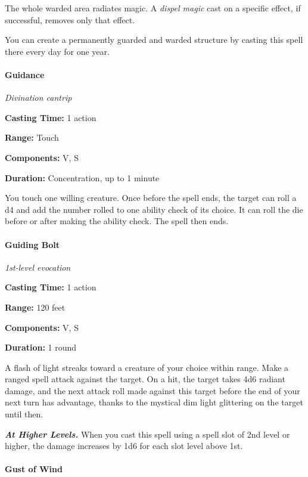 \documentclass[
]{article}
\begin{document}
The whole warded area radiates magic. A \emph{dispel magic} cast on a
specific effect, if successful, removes only that effect.

You can create a permanently guarded and warded structure by casting
this spell there every day for one year.

\hypertarget{guidance}{%
\paragraph{Guidance}\label{guidance}}

\emph{Divination cantrip}

\textbf{Casting Time:} 1 action

\textbf{Range:} Touch

\textbf{Components:} V, S

\textbf{Duration:} Concentration, up to 1 minute

You touch one willing creature. Once before the spell ends, the target
can roll a d4 and add the number rolled to one ability check of its
choice. It can roll the die before or after making the ability check.
The spell then ends.

\hypertarget{guiding-bolt}{%
\paragraph{Guiding Bolt}\label{guiding-bolt}}

\emph{1st-level evocation}

\textbf{Casting Time:} 1 action

\textbf{Range:} 120 feet

\textbf{Components:} V, S

\textbf{Duration:} 1 round

A flash of light streaks toward a creature of your choice within range.
Make a ranged spell attack against the target. On a hit, the target
takes 4d6 radiant damage, and the next attack roll made against this
target before the end of your next turn has advantage, thanks to the
mystical dim light glittering on the target until then.

\emph{\textbf{At Higher Levels.}} When you cast this spell using a spell
slot of 2nd level or higher, the damage increases by 1d6 for each slot
level above 1st.

\hypertarget{gust-of-wind}{%
\paragraph{Gust of Wind}\label{gust-of-wind}}
\end{document}
